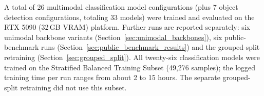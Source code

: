 A total of 26 multimodal classification model configurations (plus 7 object detection configurations, totaling 33 models) were trained and evaluated on the RTX 5090 (32\,GB VRAM) platform. Further runs are reported separately: six unimodal backbone variants (Section~\ref{sec:unimodal_backbones}), six public-benchmark runs (Section~\ref{sec:public_benchmark_results}) and the grouped-split retraining (Section~\ref{sec:grouped_split}). All twenty-six classification models were trained on the Stratified Balanced Training Subset (49{,}276 samples); the logged training time per run ranges from about 2 to 15 hours. The separate grouped-split retraining did not use this subset.
